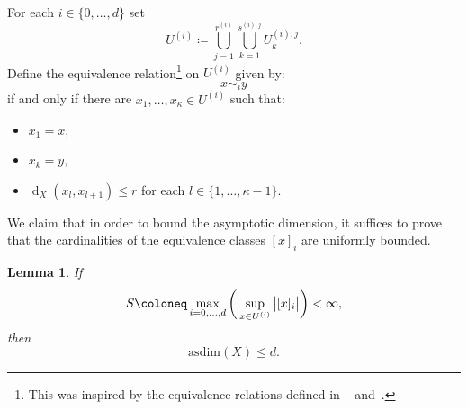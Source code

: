 \documentclass[a4paper]{amsart}
\numberwithin{equation}{section}
\DeclareMathOperator{\dist}{d}
\newcommand{\distX}[2]{{\dist_X ( #1, #2 )}}
\newcommand{\asdim}[1]{\mathrm{asdim}({#1})}
\theoremstyle{plain}
\newtheorem{lem}[thm]{Lemma}
\theoremstyle{indented}
\newcounter{claim_counter}[thm]
\numberwithin{equation}{section}
\theoremstyle{definition}
\theoremstyle{remark}
\theoremstyle{plain}
\theoremstyle{definition}
\begin{document}
 For each $i\in \{0,\hdots,d\}$ set  
    \begin{equation*}
        U^{(i)} \coloneq \bigcup_{j=1}^{r^{(i)}} \bigcup_{k=1}^{s^{(i),j}}  U^{(i),j}_k . 
    \end{equation*}
    Define the equivalence relation\footnote{This was inspired by the equivalence relations defined in 
   ~\cite[Theorem~6.4]{GuentnerWillettYu2017dynAsDim} and~\cite[Proposition~6.6]{LiLiaoWinter2023diagDim}.} 
   on $U^{(i)}$
    given by:
    \begin{equation*}
        x \sim_i y
    \end{equation*}
    if and only if there are 
    $x_1,\hdots,x_\kappa \in U^{(i)}$  
    such that:
    \begin{itemize}
        \item $x_1 = x,$
        \item $ x_k = y,$
        \item ${\distX{x_l}{x_{l+1}} \le r}$ for each $l \in \{1,\hdots,\kappa-1\}$.
    \end{itemize}
  
    We claim that in order to bound the asymptotic dimension, 
    it suffices to prove that the cardinalities
    of the equivalence classes ${[x]_{i}}$ are uniformly bounded.
    
    \begin{lem}\label{lem:LowerBoundProof1}
    If
    \begin{equation*}
        S\coloneq \max_{i=0,\hdots,d} \bigg(\sup_{x \in U^{(i)}} \big{\lvert}{ [ x ]_{i}}   \big{\rvert} \bigg) < \infty ,
    \end{equation*}
    then
    \[\asdim{X} \le d.\]
    \end{lem}
    
\end{document}
